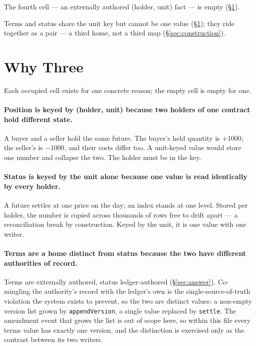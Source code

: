 \documentclass[11pt,a4paper]{article}
\begin{document}
The fourth cell --- an externally authored (holder, unit) fact --- is empty
(\S\ref{sec:why}).

Terms and status share the unit key but cannot be one value (\S\ref{sec:why}); they ride
together as a pair --- a third home, not a third map (\S\ref{sec:construction}).

\section{Why Three}
\label{sec:why}

Each occupied cell exists for one concrete reason; the empty cell is empty for
one.

\paragraph{Position is keyed by (holder, unit) because two holders of one
contract hold different state.}
A buyer and a seller hold the same future. The buyer's held quantity is $+1000$;
the seller's is $-1000$, and their costs differ too. A unit-keyed value would
store one number and collapse the two. The holder must be in the key.

\paragraph{Status is keyed by the unit alone because one value is read
identically by every holder.}
A future settles at one price on the day; an index stands at one level. Stored per
holder, the number is copied across thousands of rows free to drift apart --- a
reconciliation break by construction. Keyed by the unit, it is one value with one
writer.

\paragraph{Terms are a home distinct from status because the two have different
authorities of record.}
Terms are externally authored, status ledger-authored (\S\ref{sec:answer}). Co-mingling
the authority's record with the ledger's own is the single-source-of-truth violation the
system exists to prevent, so the two are distinct values: a non-empty version list grown
by \texttt{appendVersion}, a single value replaced by \texttt{settle}. The amendment
event that grows the list is out of scope here, so within this file every terms value has
exactly one version, and the distinction is exercised only as the contrast between its two
writers.
\end{document}
